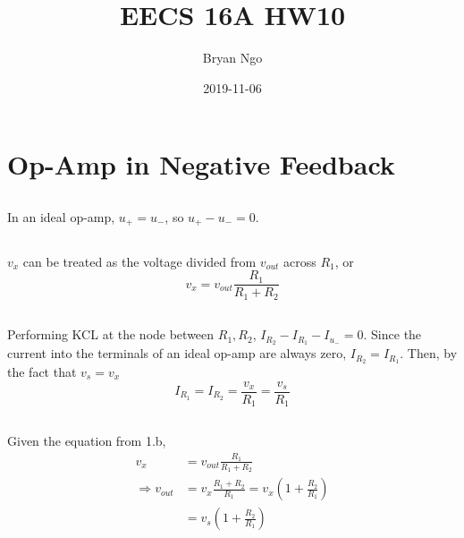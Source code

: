 \documentclass[]{article}
\title{EECS 16A HW10}
\author{Bryan Ngo}
\date{2019-11-06}
\begin{document}
\maketitle

\section{Op-Amp in Negative Feedback}

\subsection{}

In an ideal op-amp, \(u_+ = u_-\), so \(u_+ - u_- = 0\). 

\subsection{}

\(v_x\) can be treated as the voltage divided from \(v_{out}\) across \(R_1\), or 
\begin{equation}
	v_x = v_{out} \frac{R_1}{R_1 + R_2}
\end{equation}

\subsection{}

Performing KCL at the node between \(R_1, R_2\), \(I_{R_2} - I_{R_1} - I_{u_-}= 0\). 
Since the current into the terminals of an ideal op-amp are always zero, \(I_{R_2} = I_{R_1}\). 
Then, by the fact that \(v_s = v_x\)
\begin{equation}
	I_{R_1} = I_{R_2} = \frac{v_x}{R_1} = \frac{v_s}{R_1}
\end{equation}

\subsection{}

Given the equation from 1.b, 
\begin{align}
	v_x &= v_{out} \frac{R_1}{R_1 + R_2} \\
	\Rightarrow v_{out} &= v_x \frac{R_1 + R_2}{R_1} = v_x \left(1 + \frac{R_2}{R_1}\right) \\
	&= v_s \left(1 + \frac{R_2}{R_1}\right)
\end{align}

\subsection{}
\end{document}
